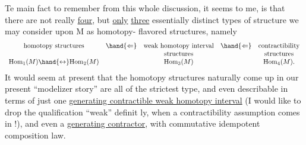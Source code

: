 Te main fact to remember from this whole discussion, it seems
to me, is that there are not really \uline{four}, but \uline{only} \uline{three} essentially
distinct types of structure  we may  consider upon M as homotopy-%
flavored structures, namely
\[
\begin{array}{ccccc}
\text{homotopy structures} & \hand{\Leftarrow} & \text{weak homotopy interval} & \hand{\Leftarrow} & \text{contractibility}\\
 & & \text{structures} & & \text{structures}\\
\mathrm{Hom}_1(M) \hand{\leftrightarrow} \mathrm{Hom}_2(M) & & \mathrm{Hom}_3(M) & & \mathrm{Hom}_4(M).
\end{array}
\]
It would seem at present that the homotopy structures  naturally
come up in our present ``modelizer story'' are all of the strictest type,
and even describable in terms of just one \uline{generating contractible weak
homotopy interval} (I would like to drop the qualification ``weak'' definit%
ly, when a contractibility assumption comes in !), and even a \uline{generating
contractor}, with commutative idempotent composition law.

